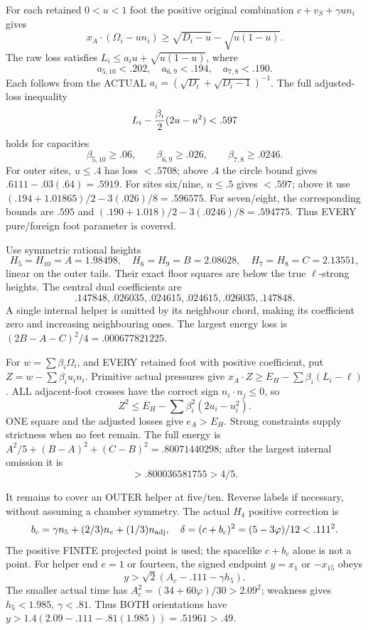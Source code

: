For each retained \(0<u<1\) foot the positive
original combination
\(c+v_S+\gamma u n_i\) gives
\[
 x_A\cdot(\Omega_i-un_i)\ge
                    \sqrt{D_i-u}-\sqrt{u(1-u)} .
\]
The raw loss satisfies
\(L_i\le a_i u+\sqrt{u(1-u)}\), where
\[
 a_{5,10}<.202,\quad a_{6,9}<.194,\quad
 a_{7,8}<.190 .
\]
Each follows from the ACTUAL
\(a_i=(\sqrt{D_i}+\sqrt{D_i-1})^{-1}\).
The full adjusted-loss inequality
\[
                 L_i-{\beta_i\over2}(2u-u^2)<.597
\]
holds for capacities
\[
 \beta_{5,10}\ge.06,\qquad
 \beta_{6,9}\ge.026,\qquad
 \beta_{7,8}\ge.0246 .
\]
For outer sites, \(u\le.4\) has loss \(<.5708\);
above \(.4\) the circle bound gives
\(.6111-.03(.64)=.5919\).
For sites six/nine, \(u\le.5\) gives \(<.597\);
above it use
\((.194+1.01865)/2-3(.026)/8=.596575\).
For seven/eight, the corresponding bounds are
\(.595\) and
\((.190+1.018)/2-3(.0246)/8=.594775\).
Thus EVERY pure/foreign foot parameter is covered.

Use symmetric rational heights
\[
 H_5=H_{10}=A=1.98498,\quad
 H_6=H_9=B=2.08628,\quad
 H_7=H_8=C=2.13551,
\]
linear on the outer tails.
Their exact floor squares are below the true
\(\ell\)-strong heights.
The central dual coefficients are
\[
                  .147848,.026035,.024615,
                  .024615,.026035,.147848 .
\]
A single internal helper is omitted by its
neighbour chord, making its coefficient zero
and increasing neighbouring ones.
The largest energy loss is
\((2B-A-C)^2/4=.000677821225\).

For \(w=\sum\beta_i\Omega_i\), and EVERY retained
foot with positive coefficient, put
\(Z=w-\sum\beta_i u_i n_i\).
Primitive actual pressures give
\(x_A\cdot Z\ge E_H-\sum\beta_i(L_i-\ell)\).
ALL adjacent-foot crosses have the correct sign
\(n_i\cdot n_j\le0\), so
\[
 Z^2\le E_H-\sum\beta_i^2(2u_i-u_i^2).
\]
ONE square and the adjusted losses give \(e_A>E_H\).
Strong constraints supply strictness when no
feet remain.
The full energy is
\(A^2/5+(B-A)^2+(C-B)^2=.80071440298\);
after the largest internal omission it is
\[
                              >.800036581755>4/5 .
\]

It remains to cover an OUTER helper at five/ten.
Reverse labels if necessary, without assuming
a chamber symmetry.
The actual \(H_4\) positive correction is
\[
 b_c=\gamma n_5+(2/3)n_e+(1/3)n_{\rm adj},\quad
 \delta=(c+b_c)^2=(5-3\varphi)/12<.111^2 .
\]
The positive FINITE projected point is used;
the spacelike \(c+b_c\) alone is not a point.
For helper end \(e=1\) or fourteen, the signed
endpoint \(y=x_1\) or \(-x_{15}\) obeys
\[
                    y>\sqrt2(A_c-.111-\gamma h_5).
\]
The smaller actual time has
\(A_c^2=(34+60\varphi)/30>2.09^2\);
weakness gives \(h_5<1.985\), \(\gamma<.81\).
Thus BOTH orientations have
\(y>1.4(2.09-.111-.81(1.985))=.51961>.49\).

